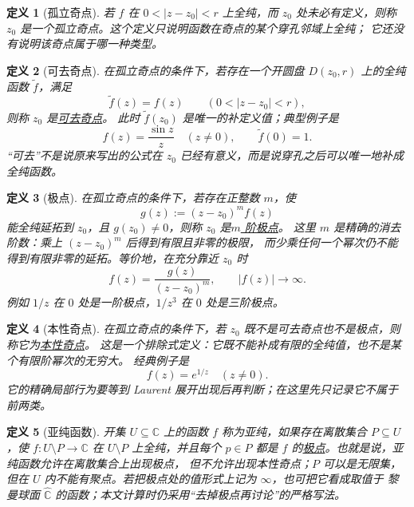\documentclass[UTF8,fontset=none,a4paper,11pt]{ctexart}
\theoremstyle{foundation-definition}
\newtheorem{definition}{定义}[section]
\theoremstyle{foundation-theorem}
\theoremstyle{foundation-proposition}
\theoremstyle{foundation-example}
\theoremstyle{foundation-remark}
\theoremstyle{foundation-theorem}
\newcommand{\C}{\mathbb C}
\newcommand{\term}[2]{\hyperref[#1]{#2}}
\begin{document}
\begin{definition}[孤立奇点]\label{def:isolated-singularity}
若 \(f\) 在 \(0<|z-z_0|<r\) 上全纯，而 \(z_0\) 处未必有定义，则称
\(z_0\) 是一个孤立奇点。这个定义只说明函数在奇点的某个穿孔邻域上全纯；
它还没有说明该奇点属于哪一种类型。
\end{definition}

\begin{definition}[可去奇点]\label{def:removable-singularity}
在孤立奇点的条件下，若存在一个开圆盘 \(D(z_0,r)\) 上的全纯函数
\(\widetilde f\)，满足
\[
\widetilde f(z)=f(z)\qquad(0<|z-z_0|<r),
\]
则称 \(z_0\) 是\term{def:removable-singularity}{可去奇点}。
此时 \(\widetilde f(z_0)\) 是唯一的补定义值；典型例子是
\[
f(z)=\frac{\sin z}{z}\quad(z\ne0),
\qquad \widetilde f(0)=1.
\]
“可去”不是说原来写出的公式在 \(z_0\) 已经有意义，而是说穿孔之后可以唯一地补成全纯函数。
\end{definition}

\begin{definition}[极点]\label{def:pole}
在孤立奇点的条件下，若存在正整数 \(m\)，使
\[
g(z):=(z-z_0)^m f(z)
\]
能全纯延拓到 \(z_0\)，且 \(g(z_0)\ne0\)，则称 \(z_0\) 是\term{def:pole}{\(m\) 阶极点}。
这里 \(m\) 是精确的消去阶数：乘上 \((z-z_0)^m\) 后得到有限且非零的极限，
而少乘任何一个幂次仍不能得到有限非零的延拓。等价地，在充分靠近 \(z_0\) 时
\[
f(z)=\frac{g(z)}{(z-z_0)^m},
\qquad |f(z)|\longrightarrow\infty.
\]
例如 \(1/z\) 在 \(0\) 处是一阶极点，\(1/z^3\) 在 \(0\) 处是三阶极点。
\end{definition}

\begin{definition}[本性奇点]\label{def:essential-singularity}
在孤立奇点的条件下，若 \(z_0\) 既不是可去奇点也不是极点，则称它为\term{def:essential-singularity}{本性奇点}。
这是一个排除式定义：它既不能补成有限的全纯值，也不是某个有限阶幂次的无穷大。
经典例子是
\[
f(z)=e^{1/z}\quad(z\ne0).
\]
它的精确局部行为要等到 Laurent 展开出现后再判断；在这里先只记录它不属于前两类。
\end{definition}

\begin{definition}[亚纯函数]\label{def:meromorphic}
开集 \(U\subseteq\C\) 上的函数 \(f\) 称为亚纯，如果存在离散集合
\(P\subseteq U\)，使 \(f:U\setminus P\to\C\) 在 \(U\setminus P\) 上全纯，并且每个
\(p\in P\) 都是 \(f\) 的\term{def:pole}{极点}。也就是说，亚纯函数允许在离散集合上出现极点，
但不允许出现本性奇点；\(P\) 可以是无限集，但在 \(U\) 内不能有聚点。若把极点处的值形式上记为 \(\infty\)，也可把它看成取值于
黎曼球面 \(\widehat{\mathbb C}\) 的函数；本文计算时仍采用“去掉极点再讨论”的严格写法。
\end{definition}
\end{document}
